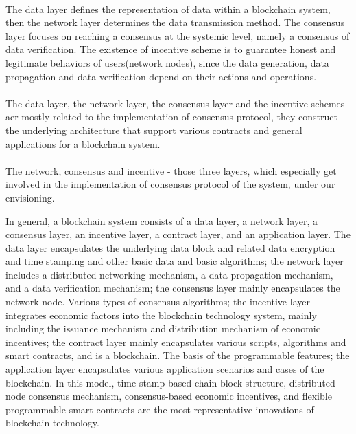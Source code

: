 \documentclass[doublespacing]{bmcart}
\begin{document}
\begin{CJK*}{UTF8}{gbsn}
\paragraph{} The data layer defines the representation of data within a blockchain system, then the network layer determines the data transmission method. The consensus layer focuses on reaching a consensus at the systemic level, namely a consensus of data verification. The existence of incentive scheme is to guarantee honest and legitimate behaviors of users(network nodes), since the data generation, data propagation and data verification depend on their actions and operations. 
\paragraph{} The data layer, the network layer, the consensus layer and the incentive schemes aer mostly related to the implementation of consensus protocol, they construct the underlying architecture that support various contracts and general applications for a blockchain system.
\paragraph{}	
	The network, consensus and incentive - those three layers, which especially get involved in the implementation of consensus protocol of the system, under our envisioning. 


In general, a blockchain system consists of a data layer, a network layer, a consensus layer, an incentive layer, a contract layer, and an application layer. The data layer encapsulates the underlying data block and related data encryption and time stamping and other basic data and basic algorithms; the network layer includes a distributed networking mechanism, a data propagation mechanism, and a data verification mechanism; the consensus layer mainly encapsulates the network node. Various types of consensus algorithms; the incentive layer integrates economic factors into the blockchain technology system, mainly including the issuance mechanism and distribution mechanism of economic incentives; the contract layer mainly encapsulates various scripts, algorithms and smart contracts, and is a blockchain. The basis of the programmable features; the application layer encapsulates various application scenarios and cases of the blockchain. In this model, time-stamp-based chain block structure, distributed node consensus mechanism, consensus-based economic incentives, and flexible programmable smart contracts are the most representative innovations of blockchain technology.


\end{CJK*}
\end{document}
